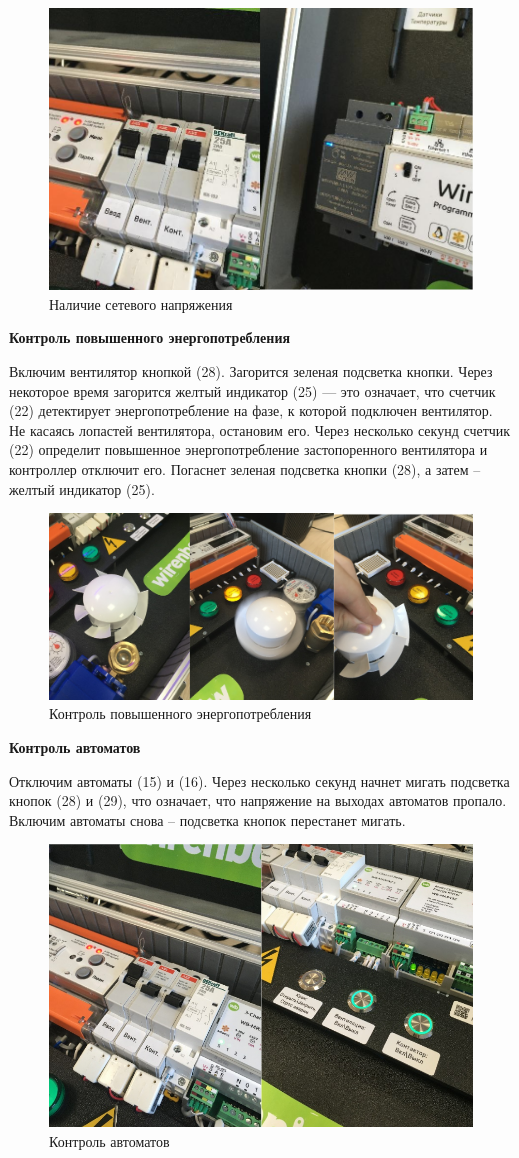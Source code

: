 \documentclass[a4paper,14pt]{extarticle}
\begin{document}
	\begin{figure}[htbp]
		\centering
		\includegraphics[width=0.6\linewidth]{images/1}
		\caption{Наличие сетевого напряжения}
		\label{fig:1}
	\end{figure}
	\script \textbf{Контроль повышенного энергопотребления}
	
	Включим вентилятор кнопкой (28). Загорится зеленая подсветка кнопки. Через некоторое
	время загорится желтый индикатор (25) --- это означает, что счетчик (22) детектирует
	энергопотребление на фазе, к которой подключен вентилятор. Не касаясь лопастей
	вентилятора, остановим его. Через несколько секунд счетчик (22) определит повышенное
	энергопотребление застопоренного вентилятора и контроллер отключит его. Погаснет
	зеленая подсветка кнопки (28), а затем -- желтый индикатор (25).	

\begin{figure}[htbp]
	\centering
	\includegraphics[width=0.6\linewidth]{images/fan}
	\caption{Контроль повышенного энергопотребления}
	\label{fig:fan}
\end{figure}

	
	\script  \textbf{Контроль автоматов}
	
	Отключим автоматы (15) и (16). Через несколько секунд начнет мигать подсветка кнопок
	(28) и (29), что означает, что напряжение на выходах автоматов пропало. Включим
	автоматы снова -- подсветка кнопок перестанет мигать.	
	
	\begin{figure}[htbp]
		\centering
		\includegraphics[width=0.6\linewidth]{images/power-off}
		\caption{Контроль автоматов}
		\label{fig:power-off}
	\end{figure}
	
\end{document}
